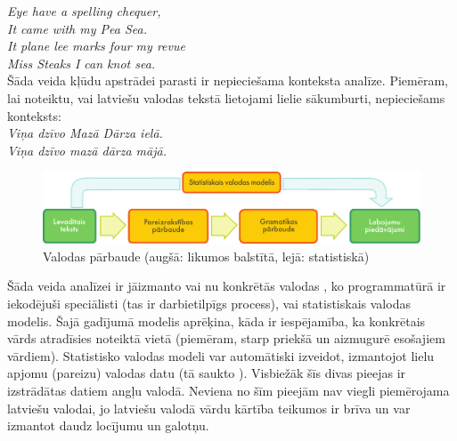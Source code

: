 \begin{multicols}{2}
\textit{Eye have a spelling chequer,}\\
\textit{It came with my Pea Sea.}\\
\textit{It plane lee marks four my revue}\\
\textit{Miss Steaks I can knot sea.} \cite{Meta15}
\\

Šāda veida kļūdu apstrādei parasti ir nepieciešama konteksta analīze.
Piemēram, lai noteiktu, vai latviešu valodas tekstā lietojami lielie sākumburti, nepieciešams konteksts:\\

\textit{Viņa dzīvo Mazā Dārza ielā.}\\
\textit{Viņa dzīvo mazā dārza mājā.}
\\

\begin{figure}[htb]
  \center
  \includegraphics[width=\textwidth]{../_media/latvian/language_checking}
  \caption{Valodas pārbaude (augšā: likumos balstītā, lejā: statistiskā)}
  \label{fig:langcheckingaarch_de}
\end{figure}

Šāda veida analīzei ir jāizmanto vai nu konkrētās valodas , ko programmatūrā ir iekodējuši speciālisti (tas ir darbietilpīgs process), vai statistiskais valodas modelis.
Šajā gadījumā modelis aprēķina, kāda ir iespējamība, ka konkrētais vārds atradīsies noteiktā vietā (piemēram, starp priekšā un aizmugurē esošajiem vārdiem).
Statistisko valodas modeli var automātiski izveidot, izmantojot lielu apjomu (pareizu) valodas datu (tā saukto ).
Visbiežāk šīs divas pieejas ir izstrādātas datiem angļu valodā.
Neviena no šīm pieejām nav viegli piemērojama latviešu valodai, jo latviešu valodā vārdu kārtība teikumos ir brīva un var izmantot daudz locījumu un galotņu. 



\end{multicols}
